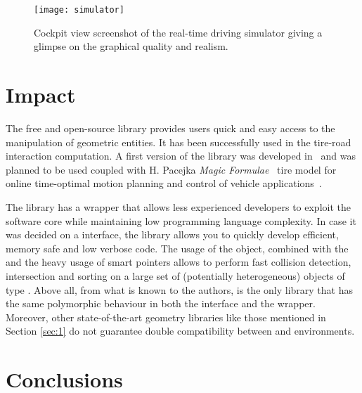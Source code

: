 \begin{figure}[!ht]
  \centering
  \texttt{[image: simulator]}
  \caption{Cockpit view screenshot of the real-time driving simulator giving a glimpse on the graphical quality and realism.}
\end{figure}


\section{Impact}

The free and open-source \Acme{} library provides users quick and easy access to the manipulation of geometric entities. It has been successfully used in the tire-road interaction computation. A first version of the library was developed in~\cite{stocco2019valutazione} and was planned to be used coupled with H. Pacejka \emph{Magic Formulae}~\cite{pacejka2012tire} tire model for online time-optimal motion planning and control of vehicle applications~\cite{piccinini2022predictive}.

The library has a \Matlab{} \Mex{} wrapper that allows less experienced developers to exploit the software core while maintaining low programming language complexity. In case it was decided on a \cpp{} interface, the library allows you to quickly develop efficient, memory safe and low verbose code. The usage of the \Collection{} object, combined with the \AabbTree{} and the heavy usage of smart pointers allows to perform fast collision detection, intersection and sorting on a large set of (potentially heterogeneous) objects of type \Entity{}. Above all, from what is known to the authors, \Acme{} is the only library that has the same polymorphic behaviour in both the \cpp{} interface and the \Matlab{} \Mex{} wrapper. Moreover, other state-of-the-art geometry libraries like those mentioned in Section \ref{sec:1} do not guarantee double compatibility between \cpp{} and \Matlab{} environments.


\section{Conclusions}

